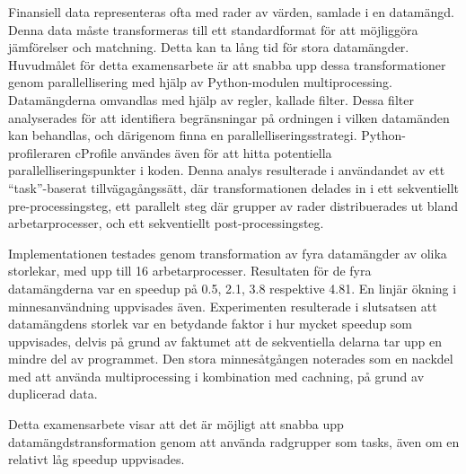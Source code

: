 Finansiell data representeras ofta med rader av värden, samlade i en datamängd. Denna data måste transformeras
till ett standardformat för att möjliggöra jämförelser och matchning. Detta kan ta lång tid för stora
datamängder. Huvudmålet för detta examensarbete är att snabba upp dessa transformationer genom parallellisering
med hjälp av Python-modulen multiprocessing. Datamängderna omvandlas med hjälp av regler, kallade filter.
Dessa filter analyserades för att identifiera begränsningar på ordningen i vilken datamänden kan behandlas,
och därigenom finna en parallelliseringsstrategi. Python-profileraren cProfile användes även för att hitta
potentiella parallelliseringspunkter i koden. Denna analys resulterade i användandet av ett ``task''-baserat
tillvägagångssätt, där transformationen delades in i ett sekventiellt pre-processingsteg, ett parallelt steg 
där grupper av rader distribuerades ut bland arbetarprocesser, och ett sekventiellt post-processingsteg.

Implementationen testades genom transformation av fyra datamängder av olika storlekar, med upp till 16 
arbetarprocesser. Resultaten för de fyra datamängderna var en speedup på 0.5, 2.1, 3.8 respektive 4.81.
En linjär ökning i minnesanvändning uppvisades även. Experimenten resulterade i slutsatsen att
datamängdens storlek var en betydande faktor i hur mycket speedup som uppvisades, delvis på grund av faktumet
att de sekventiella delarna tar upp en mindre del av programmet. Den stora minnesåtgången noterades som
en nackdel med att använda multiprocessing i kombination med cachning, på grund av duplicerad data.

Detta examensarbete visar att det är möjligt att snabba upp datamängdstransformation genom att använda
radgrupper som tasks, även om en relativt låg speedup uppvisades.
